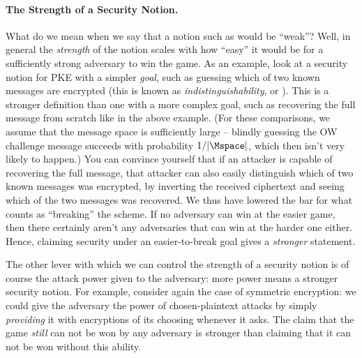       \paragraph{The Strength of a Security Notion.}
        What do we mean when we say that a notion such as \ownma would be ``weak''? Well,
          in general the \emph{strength} of the notion scales with how ``easy'' it
          would be for a sufficiently strong adversary to win the game.
          As an example, look at a security notion for PKE with a simpler \emph{goal}, such as guessing
          which of two known messages are encrypted (this is known as
          \emph{indistinguishability}, or \ind). This is a stronger definition than one with a more complex
          goal, such as recovering the full message from scratch like in the above \owcpa
          example.
          (For these comparisons, we assume that the message space \Mspace is sufficiently large --
          blindly guessing the OW challenge message succeeds with probability \(1/|\Mspace|\),
          which then isn't very likely to happen.)
          You can convince yourself that if an attacker is capable of recovering the full message,
          that attacker can also easily distinguish which of two known messages was encrypted,
          by inverting the received ciphertext and seeing which of the two messages was recovered.
          We thus have lowered the bar for what counts as ``breaking'' the scheme. If
          no adversary can win at the easier game, then
          there certainly aren't any adversaries that can win at the harder one
          either. Hence, claiming security under an easier-to-break goal gives a
          \emph{stronger} statement. 
		
        The other lever with which we can control the
          strength of a security notion is of course the attack power given to the
          adversary: more power means a stronger security notion. For
          example, consider again the case of symmetric encryption: we could give
          the adversary the power of chosen-plaintext attacks by simply
          \emph{providing} it with encryptions of its choosing whenever it asks.
          The claim that the game \emph{still} can not be won by any adversary is
          stronger than claiming that it can not be won without this ability.

